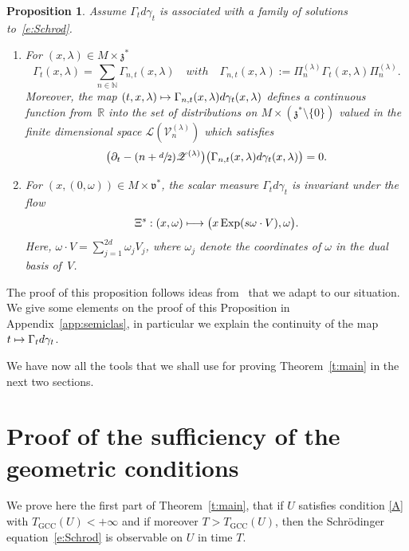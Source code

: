 \documentclass[10pt]{amsart}
\let\mathcal\mathscr
\newcommand\mto{\mathchoice{\longmapsto}{\mapsto}{\mapsto}{\mapsto}}
\newcommand{\GCC}{\mathrm{GCC}}
\DeclareMathOperator{\Exp}{Exp}
\theoremstyle{plain}
\newtheorem{proposition}[theorem]{Proposition}
\theoremstyle{definition}
\def\R{{\mathbb R}}
\def\N{{\mathbb N}}
\begin{document}
\begin{proposition} \label{p:measure0}
Assume $\Gamma_t d\gamma_t$ is associated with a family of solutions to~\eqref{e:Schrod}.
\begin{enumerate}
\item\label{p:measure01} For $(x,\lambda)\in M\times \mathfrak z^*$
\begin{equation}\label{eq:decomp}
\Gamma_t(x,\lambda)=\sum_{n\in\N } \Gamma_{n,t}(x,\lambda)\quad { with}\quad \Gamma_{n,t}(x,\lambda):= \Pi_n^{(\lambda)}\Gamma_t(x,\lambda) \Pi_n^{(\lambda)}.
\end{equation}
Moreover,
the map $(t,x,\lambda)\mto \Gamma_{n,t}(x,\lambda) d\gamma_t(x,\lambda)$ defines
a continuous function from~$\R$ into the set of distributions on $M\times (\mathfrak z^*\setminus\{0\})$ valued in the finite dimensional space ${\mathcal L}(\mathcal V_n^{(\lambda)})$ which
satisfies
\begin{equation}\label{transport}
\bigl(\partial_t -(n+\sfrac d 2) {\mathcal Z}^{(\lambda)}\bigr) \bigl(\Gamma_{n,t}(x,\lambda)d\gamma_t(x,\lambda) \bigr)=0.
\end{equation}
\item\label{p:measure02} For $(x,(0,\omega))\in M\times \mathfrak v^*$, the scalar measure $\Gamma_t d\gamma_t$ is invariant under the flow
\[
\Xi ^s:(x,\omega) \mto \bigl(x\Exp (s\omega\cdot V),\omega\bigr).
\]
Here, $\omega\cdot V=\sum_{j=1}^{2d} \omega_jV_j$, where $\omega_j$ denote the coordinates of $\omega$ in the dual basis of~$V$.
\end{enumerate}
\end{proposition}

The proof of this proposition follows ideas from~\cite{FF} that we adapt to our situation. We give some elements on the proof of this Proposition in Appendix~\ref{app:semiclas}, in particular we explain the continuity of the map $t\mto \Gamma_t d\gamma_t$.

We have now all the tools that we shall use for proving Theorem~\ref{t:main} in the next two sections.

\section{Proof of the sufficiency of the geometric conditions} \label{s:proofsufficiency}

We prove here the first part of Theorem~\ref{t:main}, that if $U$ satisfies condition \eqref{A} with $T_\GCC(U) <+\infty$ and if moreover $T>T_\GCC(U)$, then the Schrödinger equation~\eqref{e:Schrod} is observable on $U$ in time $T$.
\end{document}
